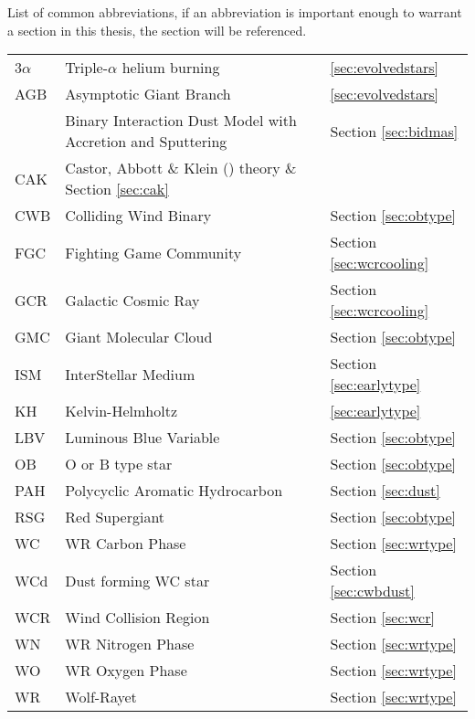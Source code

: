 \begin{abbreviations}
List of common abbreviations, if an abbreviation is important enough to warrant a section in this thesis, the section will be referenced.

\begin{table}[h]
  \centering
  \begin{tabular}{l|l|l}
    
    \hline

    3$\alpha$ & Triple-$\alpha$ helium burning & \ref{sec:evolvedstars} \\
    AGB & Asymptotic Giant Branch & \ref{sec:evolvedstars} \\
    \bidmas{} & Binary Interaction Dust Model with Accretion and Sputtering & Section \ref{sec:bidmas} \\
    CAK & Castor, Abbott \& Klein (\citeyear{castor_radiation-driven_1975}) theory \& Section \ref{sec:cak} \\
    CWB & Colliding Wind Binary  & Section \ref{sec:obtype} \\
    FGC & Fighting Game Community & Section \ref{sec:wcrcooling} \\
    GCR & Galactic Cosmic Ray & Section \ref{sec:wcrcooling} \\
    GMC & Giant Molecular Cloud & Section \ref{sec:obtype}\\
    ISM & InterStellar Medium & Section \ref{sec:earlytype} \\
    KH  & Kelvin-Helmholtz & \ref{sec:earlytype} \\ 
    LBV & Luminous Blue Variable & Section \ref{sec:obtype} \\
    OB  & O or B type star & Section \ref{sec:obtype} \\ 
    PAH & Polycyclic Aromatic Hydrocarbon & Section \ref{sec:dust} \\
    RSG & Red Supergiant & Section \ref{sec:obtype} \\
    WC  & WR Carbon Phase & Section \ref{sec:wrtype} \\
    WCd & Dust forming WC star & Section \ref{sec:cwbdust} \\
    WCR & Wind Collision Region & Section \ref{sec:wcr} \\
    WN  & WR Nitrogen Phase & Section \ref{sec:wrtype} \\
    WO  & WR Oxygen Phase & Section \ref{sec:wrtype} \\
    WR  & Wolf-Rayet & Section \ref{sec:wrtype} \\


\end{tabular}
\end{table}
\end{abbreviations}
